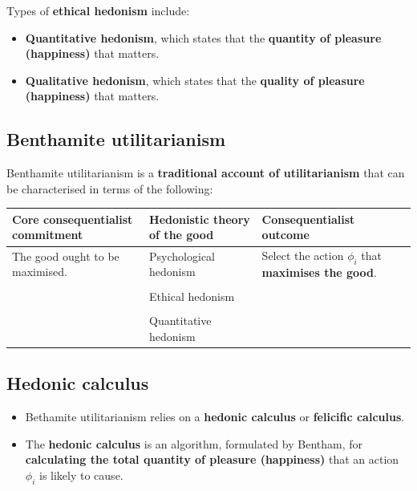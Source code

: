 \documentclass[11pt]{article}
\begin{document}
Types of \textbf{ethical hedonism} include:
\begin{itemize}
\item \textbf{Quantitative hedonism}, which states that the \textbf{quantity of pleasure (happiness)} that matters.
\item \textbf{Qualitative hedonism}, which states that the \textbf{quality of pleasure (happiness)} that matters.
\end{itemize}
\subsection{Benthamite utilitarianism}
\label{sec:org1644719}
Benthamite utilitarianism is a \textbf{traditional account of utilitarianism} that can be characterised in terms of the following:
\begin{center}
\begin{tabularx}{\textwidth}{|X|X|X|}
\hline
Core consequentialist commitment & Hedonistic theory of the good & Consequentialist outcome\\
\hline
The good ought to be maximised. & Psychological hedonism & Select the action \(\phi_i\) that \textbf{maximises the good}.\\
 &  & \\
 & Ethical hedonism & \\
 &  & \\
 & Quantitative hedonism & \\
\hline
\end{tabularx}
\end{center}
\subsection{Hedonic calculus}
\label{sec:orga08bf07}
\begin{itemize}
\item Bethamite utilitarianism relies on a \textbf{hedonic calculus} or \textbf{felicific calculus}.
\item The \textbf{hedonic calculus} is an algorithm, formulated by Bentham, for \textbf{calculating the total quantity of pleasure (happiness)} that an action \(\phi_i\) is likely to cause.
\end{itemize}
\end{document}

